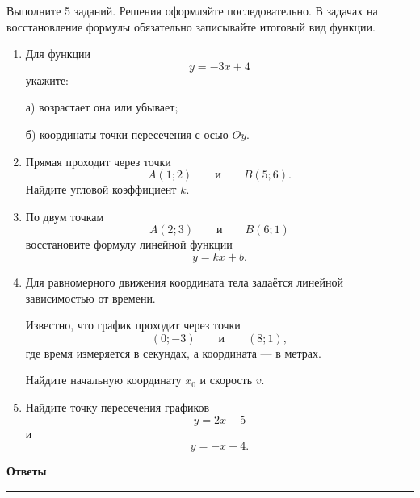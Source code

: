 \documentclass[a4paper,12pt]{article}
\newcommand{\topic}[1]{%
    \vspace{0.5em}%
    {\Large\bfseries\color{darkaccent}#1}%
    \par\vspace{0.35em}%
    {\color{softgray}\rule{\linewidth}{0.7pt}}%
    \vspace{0.45em}%
}
\begin{document}
Выполните 5 заданий.
Решения оформляйте последовательно.
В задачах на восстановление формулы
обязательно записывайте итоговый вид функции.

\begin{enumerate}

    \item
    Для функции
    \[
        y=-3x+4
    \]
    укажите:

    а) возрастает она или убывает;

    б) координаты точки пересечения
    с осью $Oy$.

    \item
    Прямая проходит через точки
    \[
        A(1;2)
        \qquad\text{и}\qquad
        B(5;6).
    \]
    Найдите угловой коэффициент $k$.

    \item
    По двум точкам
    \[
        A(2;3)
        \qquad\text{и}\qquad
        B(6;1)
    \]
    восстановите формулу линейной функции
    \[
        y=kx+b.
    \]

    \item
    Для равномерного движения координата тела
    задаётся линейной зависимостью от времени.

    Известно, что график проходит через точки
    \[
        (0;-3)
        \qquad\text{и}\qquad
        (8;1),
    \]
    где время измеряется в секундах,
    а координата --- в метрах.

    Найдите начальную координату $x_0$
    и скорость $v$.

    \item
    Найдите точку пересечения графиков
    \[
        y=2x-5
    \]
    и
    \[
        y=-x+4.
    \]

\end{enumerate}


\clearpage

\topic{Ответы}

\renewcommand{\arraystretch}{1.35}
\end{document}
